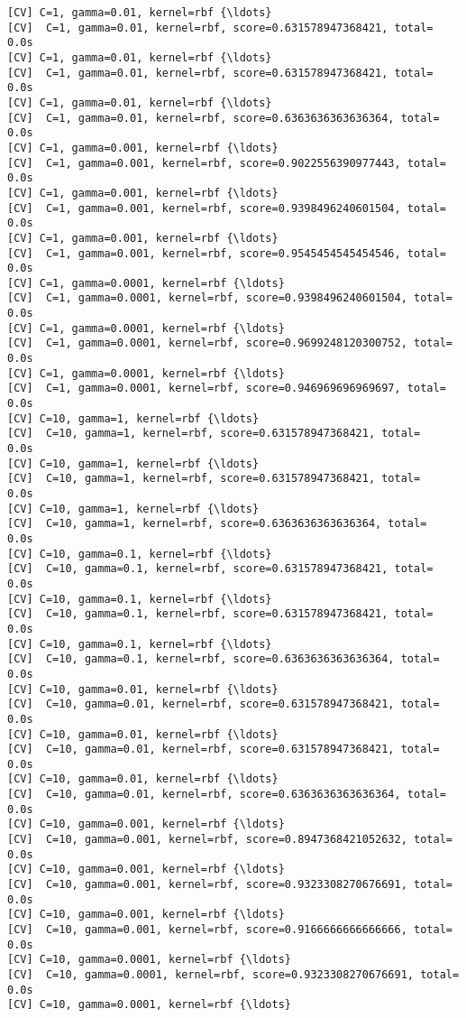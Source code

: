 \documentclass[11pt]{article}
\begin{document}
\begin{Verbatim}[commandchars=\\\{\}]
[CV] C=1, gamma=0.01, kernel=rbf {\ldots}
[CV]  C=1, gamma=0.01, kernel=rbf, score=0.631578947368421, total=   0.0s
[CV] C=1, gamma=0.01, kernel=rbf {\ldots}
[CV]  C=1, gamma=0.01, kernel=rbf, score=0.631578947368421, total=   0.0s
[CV] C=1, gamma=0.01, kernel=rbf {\ldots}
[CV]  C=1, gamma=0.01, kernel=rbf, score=0.6363636363636364, total=   0.0s
[CV] C=1, gamma=0.001, kernel=rbf {\ldots}
[CV]  C=1, gamma=0.001, kernel=rbf, score=0.9022556390977443, total=   0.0s
[CV] C=1, gamma=0.001, kernel=rbf {\ldots}
[CV]  C=1, gamma=0.001, kernel=rbf, score=0.9398496240601504, total=   0.0s
[CV] C=1, gamma=0.001, kernel=rbf {\ldots}
[CV]  C=1, gamma=0.001, kernel=rbf, score=0.9545454545454546, total=   0.0s
[CV] C=1, gamma=0.0001, kernel=rbf {\ldots}
[CV]  C=1, gamma=0.0001, kernel=rbf, score=0.9398496240601504, total=   0.0s
[CV] C=1, gamma=0.0001, kernel=rbf {\ldots}
[CV]  C=1, gamma=0.0001, kernel=rbf, score=0.9699248120300752, total=   0.0s
[CV] C=1, gamma=0.0001, kernel=rbf {\ldots}
[CV]  C=1, gamma=0.0001, kernel=rbf, score=0.946969696969697, total=   0.0s
[CV] C=10, gamma=1, kernel=rbf {\ldots}
[CV]  C=10, gamma=1, kernel=rbf, score=0.631578947368421, total=   0.0s
[CV] C=10, gamma=1, kernel=rbf {\ldots}
[CV]  C=10, gamma=1, kernel=rbf, score=0.631578947368421, total=   0.0s
[CV] C=10, gamma=1, kernel=rbf {\ldots}
[CV]  C=10, gamma=1, kernel=rbf, score=0.6363636363636364, total=   0.0s
[CV] C=10, gamma=0.1, kernel=rbf {\ldots}
[CV]  C=10, gamma=0.1, kernel=rbf, score=0.631578947368421, total=   0.0s
[CV] C=10, gamma=0.1, kernel=rbf {\ldots}
[CV]  C=10, gamma=0.1, kernel=rbf, score=0.631578947368421, total=   0.0s
[CV] C=10, gamma=0.1, kernel=rbf {\ldots}
[CV]  C=10, gamma=0.1, kernel=rbf, score=0.6363636363636364, total=   0.0s
[CV] C=10, gamma=0.01, kernel=rbf {\ldots}
[CV]  C=10, gamma=0.01, kernel=rbf, score=0.631578947368421, total=   0.0s
[CV] C=10, gamma=0.01, kernel=rbf {\ldots}
[CV]  C=10, gamma=0.01, kernel=rbf, score=0.631578947368421, total=   0.0s
[CV] C=10, gamma=0.01, kernel=rbf {\ldots}
[CV]  C=10, gamma=0.01, kernel=rbf, score=0.6363636363636364, total=   0.0s
[CV] C=10, gamma=0.001, kernel=rbf {\ldots}
[CV]  C=10, gamma=0.001, kernel=rbf, score=0.8947368421052632, total=   0.0s
[CV] C=10, gamma=0.001, kernel=rbf {\ldots}
[CV]  C=10, gamma=0.001, kernel=rbf, score=0.9323308270676691, total=   0.0s
[CV] C=10, gamma=0.001, kernel=rbf {\ldots}
[CV]  C=10, gamma=0.001, kernel=rbf, score=0.9166666666666666, total=   0.0s
[CV] C=10, gamma=0.0001, kernel=rbf {\ldots}
[CV]  C=10, gamma=0.0001, kernel=rbf, score=0.9323308270676691, total=   0.0s
[CV] C=10, gamma=0.0001, kernel=rbf {\ldots}

\end{Verbatim}
\end{document}
